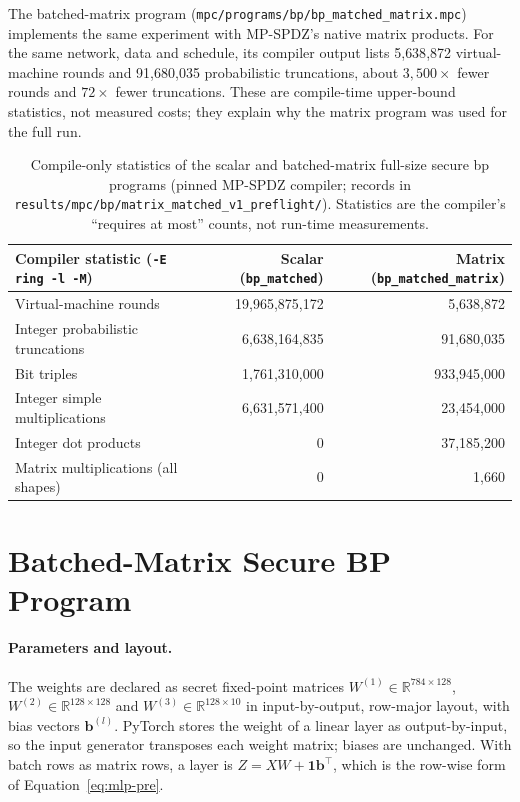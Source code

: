 The batched-matrix program (\texttt{mpc/\allowbreak programs/\allowbreak bp/\allowbreak bp\_\allowbreak matched\_\allowbreak matrix.mpc}) implements the same experiment with MP-SPDZ's native matrix products. For the same network, data and schedule, its compiler output lists 5{,}638{,}872 virtual-machine rounds and 91{,}680{,}035 probabilistic truncations, about $3{,}500\times$ fewer rounds and $72\times$ fewer truncations. These are compile-time upper-bound statistics, not measured costs; they explain why the matrix program was used for the full run.

\begin{table}[ht]
\centering
\small
\begin{tabular}{@{}>{\raggedright\arraybackslash}p{6.0cm}rr@{}}
\toprule
Compiler statistic (\texttt{-E ring -l -M}) & Scalar (\texttt{bp\_matched}) & Matrix (\texttt{bp\_matched\_matrix}) \\
\midrule
Virtual-machine rounds & 19{,}965{,}875{,}172 & 5{,}638{,}872 \\
Integer probabilistic truncations & 6{,}638{,}164{,}835 & 91{,}680{,}035 \\
Bit triples & 1{,}761{,}310{,}000 & 933{,}945{,}000 \\
Integer simple multiplications & 6{,}631{,}571{,}400 & 23{,}454{,}000 \\
Integer dot products & 0 & 37{,}185{,}200 \\
Matrix multiplications (all shapes) & 0 & 1{,}660 \\
\bottomrule
\end{tabular}
\caption{Compile-only statistics of the scalar and batched-matrix full-size secure \ac{bp} programs (pinned MP-SPDZ compiler; records in \texttt{results/mpc/bp/matrix\_matched\_v1\_preflight/}). Statistics are the compiler's ``requires at most'' counts, not run-time measurements.}
\label{tab:impl-scalar-matrix}
\end{table}

\section{Batched-Matrix Secure BP Program}\label{sec:impl-matrix}
\paragraph{Parameters and layout.} The weights are declared as secret fixed-point matrices $W^{(1)}\in\mathbb{R}^{784\times128}$, $W^{(2)}\in\mathbb{R}^{128\times128}$ and $W^{(3)}\in\mathbb{R}^{128\times10}$ in input-by-output, row-major layout, with bias vectors $\mathbf{b}^{(l)}$. PyTorch stores the weight of a linear layer as output-by-input, so the input generator transposes each weight matrix; biases are unchanged. With batch rows as matrix rows, a layer is $Z=XW+\mathbf{1}\mathbf{b}^\top$, which is the row-wise form of Equation~\eqref{eq:mlp-pre}.


